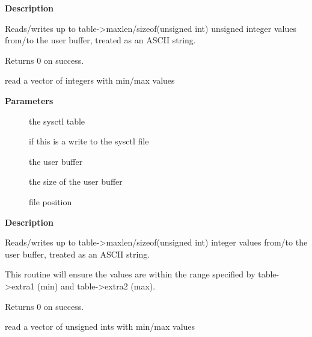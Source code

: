 \documentclass[a4paper,8pt,english]{sphinxmanual}
\begin{document}
\textbf{Description}

Reads/writes up to table-\textgreater{}maxlen/sizeof(unsigned int) unsigned integer
values from/to the user buffer, treated as an ASCII string.

Returns 0 on success.

\begin{fulllineitems}
\label{filesystems/index:c.proc_dointvec_minmax}
read a vector of integers with min/max values

\end{fulllineitems}


\textbf{Parameters}
\begin{description}
\item[{}] \leavevmode
the sysctl table

\item[{}] \leavevmode
{} if this is a write to the sysctl file

\item[{}] \leavevmode
the user buffer

\item[{}] \leavevmode
the size of the user buffer

\item[{}] \leavevmode
file position

\end{description}

\textbf{Description}

Reads/writes up to table-\textgreater{}maxlen/sizeof(unsigned int) integer
values from/to the user buffer, treated as an ASCII string.

This routine will ensure the values are within the range specified by
table-\textgreater{}extra1 (min) and table-\textgreater{}extra2 (max).

Returns 0 on success.

\begin{fulllineitems}
\label{filesystems/index:c.proc_douintvec_minmax}
read a vector of unsigned ints with min/max values

\end{fulllineitems}
\end{document}
